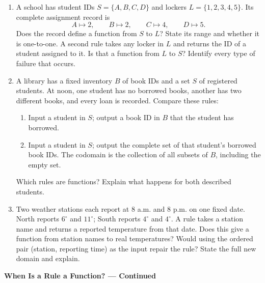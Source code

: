 \documentclass[11pt]{article}
\begin{document}
\begin{enumerate}[leftmargin=*,itemsep=0pt]
  \item A school has student IDs $S=\{A,B,C,D\}$ and lockers
  $L=\{1,2,3,4,5\}$. Its complete assignment record is
  \[
    A\mapsto2,\qquad B\mapsto2,\qquad C\mapsto4,\qquad D\mapsto5.
  \]
  Does the record define a function from $S$ to $L$? State its range and
  whether it is one-to-one. A second rule takes any locker in $L$ and
  returns the ID of a student assigned to it. Is that a function from
  $L$ to $S$? Identify every type of failure that occurs.

  \item A library has a fixed inventory $B$ of book IDs and a set $S$ of
  registered students. At noon, one student has no borrowed books, another
  has two different books, and every loan is recorded. Compare these rules:
  \begin{enumerate}[label=(\alph*),leftmargin=1.6em,itemsep=0.25em]
    \item Input a student in $S$; output a book ID in $B$ that the student
    has borrowed.
    \item Input a student in $S$; output the complete set of that student's
    borrowed book IDs. The codomain is the collection of all subsets of $B$,
    including the empty set.
  \end{enumerate}
  Which rules are functions? Explain what happens for both described students.

  \item Two weather stations each report at 8 a.m. and 8 p.m. on one fixed
  date. North reports $6^\circ$ and $11^\circ$; South reports $4^\circ$ and
  $4^\circ$. A rule takes a station name and returns a reported temperature
  from that date. Does this give a function from station names to real
  temperatures? Would using the ordered pair (station, reporting time) as
  the input repair the rule? State the full new domain and explain.
\end{enumerate}

\newpage
\begin{center}
  {\large\textbf{When Is a Rule a Function? --- Continued}}
\end{center}
\end{document}
